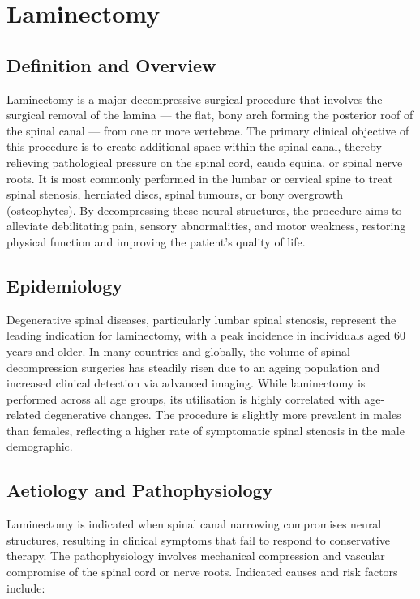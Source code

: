 \chapter{Laminectomy}

\section*{Definition and Overview}
Laminectomy is a major decompressive surgical procedure that involves the surgical removal of the lamina --- the flat, bony arch forming the posterior roof of the spinal canal --- from one or more vertebrae. The primary clinical objective of this procedure is to create additional space within the spinal canal, thereby relieving pathological pressure on the spinal cord, cauda equina, or spinal nerve roots. It is most commonly performed in the lumbar or cervical spine to treat spinal stenosis, herniated discs, spinal tumours, or bony overgrowth (osteophytes). By decompressing these neural structures, the procedure aims to alleviate debilitating pain, sensory abnormalities, and motor weakness, restoring physical function and improving the patient's quality of life.

\section*{Epidemiology}
Degenerative spinal diseases, particularly lumbar spinal stenosis, represent the leading indication for laminectomy, with a peak incidence in individuals aged 60 years and older. In many countries and globally, the volume of spinal decompression surgeries has steadily risen due to an ageing population and increased clinical detection via advanced imaging. While laminectomy is performed across all age groups, its utilisation is highly correlated with age-related degenerative changes. The procedure is slightly more prevalent in males than females, reflecting a higher rate of symptomatic spinal stenosis in the male demographic.

\section*{Aetiology and Pathophysiology}
Laminectomy is indicated when spinal canal narrowing compromises neural structures, resulting in clinical symptoms that fail to respond to conservative therapy. The pathophysiology involves mechanical compression and vascular compromise of the spinal cord or nerve roots. Indicated causes and risk factors include:

